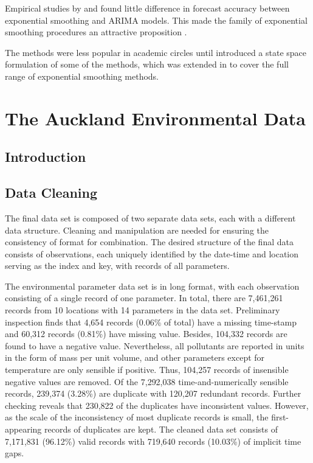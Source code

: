 \documentclass{aucklandthesis}
\begin{document}
Empirical studies by \textcite{MH79} and \textcite{Metal82} found little difference in forecast accuracy between exponential smoothing and ARIMA models. This made the family of exponential smoothing procedures an attractive proposition \autocite[see][]{CKOS01}.

The methods were less popular in academic circles until \textcite{OKS97} introduced a state space formulation of some of the methods, which was extended in \textcite{HKSG02} to cover the full range of exponential smoothing methods.

\hypertarget{ch:data}{%
\chapter{The Auckland Environmental Data}\label{ch:data}}

\hypertarget{sec:intro}{%
\section{Introduction}\label{sec:intro}}

\hypertarget{sec:clean}{%
\section{Data Cleaning}\label{sec:clean}}

The final data set is composed of two separate data sets, each with a different data structure. Cleaning and manipulation are needed for ensuring the consistency of format for combination. The desired structure of the final data consists of observations, each uniquely identified by the date-time and location serving as the index and key, with records of all parameters.

The environmental parameter data set is in long format, with each observation consisting of a single record of one parameter. In total, there are 7,461,261 records from 10 locations with 14 parameters in the data set. Preliminary inspection finds that 4,654 records (0.06\% of total) have a missing time-stamp and 60,312 records (0.81\%) have missing value. Besides, 104,332 records are found to have a negative value. Nevertheless, all pollutants are reported in units in the form of mass per unit volume, and other parameters except for temperature are only sensible if positive. Thus, 104,257 records of insensible negative values are removed. Of the 7,292,038 time-and-numerically sensible records, 239,374 (3.28\%) are duplicate with 120,207 redundant records. Further checking reveals that 230,822 of the duplicates have inconsistent values. However, as the scale of the inconsistency of most duplicate records is small, the first-appearing records of duplicates are kept. The cleaned data set consists of 7,171,831 (96.12\%) valid records with 719,640 records (10.03\%) of implicit time gaps.
\end{document}
